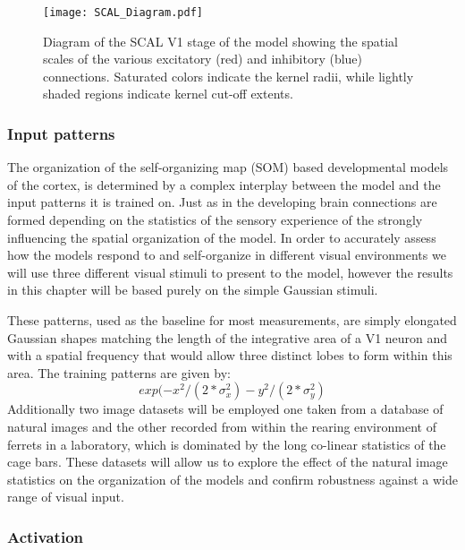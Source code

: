 \begin{figure}
	\centering
        \texttt{[image: SCAL\_Diagram.pdf]}
	\caption[Schematic representation of the SCAL model.]{Diagram of
      the SCAL V1 stage of the model showing the spatial scales of the
      various excitatory (red) and inhibitory (blue)
      connections. Saturated colors indicate the kernel radii, while
      lightly shaded regions indicate kernel cut-off extents.}
	\label{SCALDiagram}
\end{figure}

\subsubsection{Input patterns}

The organization of the self-organizing map (SOM) based developmental
models of the cortex, is determined by a complex interplay between the
model and the input patterns it is trained on. Just as in the
developing brain connections are formed depending on the statistics of
the sensory experience of the strongly influencing the spatial
organization of the model. In order to accurately assess how the
models respond to and self-organize in different visual environments
we will use three different visual stimuli to present to the model,
however the results in this chapter will be based purely on the simple
Gaussian stimuli.

These patterns, used as the baseline for most measurements, are simply
elongated Gaussian shapes matching the length of the integrative area
of a V1 neuron and with a spatial frequency that would allow three
distinct lobes to form within this area. The training patterns are
given by:
\begin{equation}
  exp(-x^2/(2*\sigma_x^2) - y^2/(2*\sigma_y^2)
\label{eqn:gausspattern}
\end{equation}
Additionally two image datasets will be employed one taken from a
database of natural images and the other recorded from within the
rearing environment of ferrets in a laboratory, which is dominated by
the long co-linear statistics of the cage bars. These datasets will
allow us to explore the effect of the natural image statistics on the
organization of the models and confirm robustness against a wide range
of visual input.

\subsubsection{Activation}

